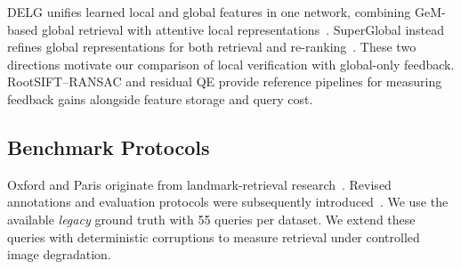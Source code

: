 DELG unifies learned local and global features in one network, combining GeM-based global retrieval with attentive local representations~\cite{delg}. SuperGlobal instead refines global representations for both retrieval and re-ranking~\cite{superglobal}. These two directions motivate our comparison of local verification with global-only feedback. RootSIFT--RANSAC and residual QE provide reference pipelines for measuring feedback gains alongside feature storage and query cost.

\subsection{Benchmark Protocols}
Oxford and Paris originate from landmark-retrieval research~\cite{oxford,paris}. Revised annotations and evaluation protocols were subsequently introduced~\cite{revisited}. We use the available \emph{legacy} ground truth with 55 queries per dataset. We extend these queries with deterministic corruptions to measure retrieval under controlled image degradation.
